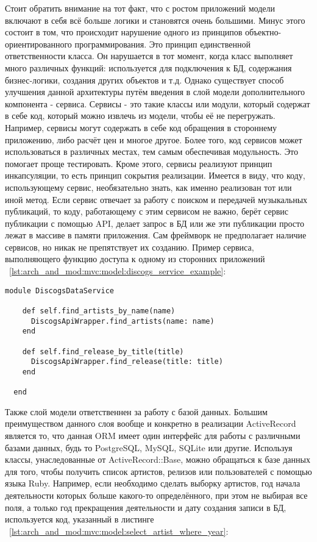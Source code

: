 Стоит обратить внимание на тот факт, что с ростом приложений модели включают в себя всё больше логики и становятся очень большими. Минус этого состоит в том, что происходит нарушение одного из принципов объектно-ориентированного программирования. Это принцип единственной ответственности класса. Он нарушается в тот момент, когда класс выполняет много различных функций: используется для подключения к БД, содержания бизнес-логики, создания других объектов и т.д. Однако существует способ улучшения данной архитектуры путём введения в слой модели дополнительного компонента - сервиса. Сервисы - это такие классы или модули, который содержат в себе код, который можно извлечь из модели, чтобы её не перегружать. Например, сервисы могут содержать в себе код обращения в стороннему приложению, либо расчёт цен и многое другое. Более того, код сервисов может использоваться в различных местах, тем самым обеспечивая модульность. Это помогает проще тестировать. Кроме этого, сервисы реализуют принцип инкапсуляции, то есть принцип сокрытия реализации. Имеется в виду, что коду, использующему сервис, необязательно знать, как именно реализован тот или иной метод. Если сервис отвечает за работу с поиском и передачей музыкальных публикаций, то коду, работающему с этим сервисом не важно, берёт сервис публикации с помощью API, делает запрос в БД или же эти публикации просто лежат в массиве в памяти приложения. Сам фреймворк не предполагает наличие сервисов, но никак не препятствует их созданию. Пример сервиса, выполняющего функцию доступа к одному из сторонних приложений ~\ref{lst:arch_and_mod:mvc:model:discogs_service_example}:

\begin{lstlisting}[style=fsharpstyle,caption={Пример получения артистов по определённым параметрам}, label=lst:arch_and_mod:mvc:model:discogs_service_example]
  module DiscogsDataService

    def self.find_artists_by_name(name)
      DiscogsApiWrapper.find_artists(name: name)
    end

    def self.find_release_by_title(title)
      DiscogsApiWrapper.find_release(title: title)
    end

  end
\end{lstlisting}

Также слой модели ответственнен за работу с базой данных. Большим преимуществом данного слоя вообще и конкретно в реализации ActiveRecord является то, что данная ORM имеет один интерфейс для работы с различными базами данных, будь то PostgreSQL, MySQL, SQLite или другие. Используя классы, унаследованные от ActiveRecord::Base, можно обращаться к базе данных для того, чтобы получить список артистов, релизов или пользователей с помощью языка Ruby. Например, если необходимо сделать выборку артистов, год начала деятельности которых больше какого-то определённого, при этом не выбирая все поля, а только год прекращения деятельности и дату создания записи в БД, используется код, указанный в листинге ~\ref{lst:arch_and_mod:mvc:model:select_artist_where_year}:

